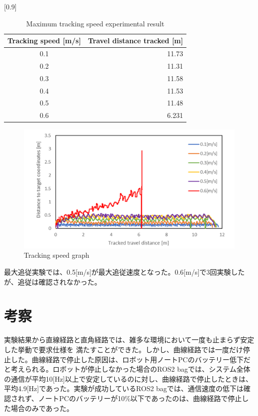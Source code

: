 \begin{table}[h]
  \begin{center}
    \caption{{Maximum tracking speed experimental result}\label{Maximum tracking speed experimental result}}
    \scalebox{1.0}[0.9]{
      \begin{tabular}{c|r} \hline
        Tracking speed [m/s] & Travel distance tracked [m] \\ \hline
        0.1 & 11.73 \\
        0.2 & 11.31 \\
        0.3 & 11.58 \\
        0.4 & 11.53 \\
        0.5 & 11.48 \\
        0.6 & 6.231 \\ \hline
      \end{tabular}
    }
  \end{center}
\end{table}

\begin{figure}[h]
  \begin{center}
  \includegraphics[width=150mm,clip]{figure/Maximum-tracking-speed-experimental-result.png}
  \caption{Tracking speed graph}
  \label{Tracking speed graph}
  \end{center}
\end{figure}

最大追従実験では、0.5[m/s]が最大追従速度となった。0.6[m/s]で3回実験したが、追従は確認されなかった。

\section{考察}
実験結果から直線経路と直角経路では、雑多な環境において一度も止まらず安定した挙動で要求仕様を
満たすことができた。しかし、曲線経路では一度だけ停止した。曲線経路で停止した原因は、ロボット用ノートPCのバッテリー低下だと考えられる。ロボットが停止しなかった場合のROS2 bagでは、システム全体の通信が平均10[Hz]以上で安定しているのに対し、曲線経路で停止したときは、平均4.9[Hz]であった。実験が成功しているROS2 bagでは、通信速度の低下は確認されず、ノートPCのバッテリーが10\%以下であったのは、曲線経路で停止した場合のみであった。